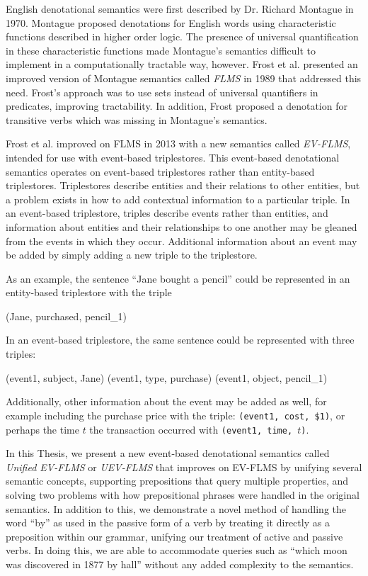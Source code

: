 \documentclass[../main.tex]{subfiles}
\begin{document}
English denotational semantics were first described by Dr. Richard Montague in 1970\cite{dowty2012introduction}.  Montague proposed
denotations for English words using characteristic functions described in higher order logic.
The presence of universal quantification in these characteristic functions made Montague's semantics difficult to implement in a computationally tractable way, however.
Frost et al. presented an improved version of Montague semantics called {\em FLMS} in 1989\cite{frost1989constructing} that addressed this need.  Frost's approach was to use sets instead of universal quantifiers in predicates, improving tractability.  In addition, Frost proposed a denotation for transitive verbs which was missing in Montague's semantics\cite{frost2013event}.

Frost et al. improved on FLMS in 2013 with a new semantics called {\em EV-FLMS}\cite{frost2013event}, intended for use with event-based triplestores.
This event-based denotational semantics operates on event-based triplestores\cite{frost2014demonstration} rather than entity-based triplestores.  Triplestores describe entities and their relations to other entities, but a problem exists in how to add contextual information to a particular triple.  In an event-based triplestore, triples describe events rather than entities, and information about entities and their relationships to one another may be gleaned from the events in which they occur.  Additional information about an event may be added by simply adding a new triple to the triplestore.

As an example, the sentence ``Jane bought a pencil'' could be represented in an entity-based triplestore with the triple


\begin{code}
	(Jane, purchased, pencil_1)
\end{code}

In an event-based triplestore, the same sentence could be represented with three triples:

\begin{code}
	(event1, subject, Jane)
	(event1, type, purchase)
	(event1, object, pencil_1)
\end{code}
	
Additionally, other information about the event may be added as well, for example including the purchase price with the triple: \texttt{(event1, cost, \$1)}, or perhaps the time $t$ the transaction occurred with \texttt{(event1, time, $t$)}.

In this Thesis, we present a new event-based denotational semantics called {\em Unified EV-FLMS} or {\em UEV-FLMS} that improves on EV-FLMS by unifying several semantic concepts,
supporting prepositions that query multiple properties, and solving two problems with how prepositional phrases were handled in the original semantics.
In addition to this, we demonstrate a novel method of handling the word ``by'' as used in the passive form of a verb by treating it directly as a preposition within our grammar, unifying our treatment of active and passive verbs.  In doing this, we are able to accommodate queries such as ``which moon was discovered in 1877 by hall'' without any added complexity to the semantics.
\end{document}
